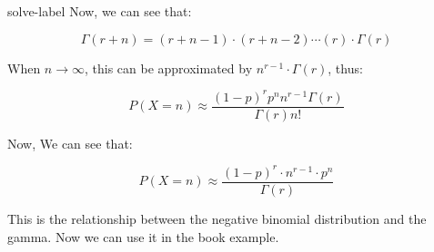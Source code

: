 \begin{solve}{}{solve-label}
Now, we can see that:

\[
\Gamma(r+n) = (r+n-1) \cdot (r+n-2) \cdots (r) \cdot \Gamma(r)
\]

When $n \rightarrow \infty$, this can be approximated by \(n^{r-1} \cdot \Gamma(r)\), thus:

\[
P(X = n) \approx \frac{(1-p)^r p^n n^{r-1} \Gamma(r)}{\Gamma(r) n!}
\]

Now, We can see that:

\[
P(X = n) \approx \frac{(1-p)^r \cdot n^{r-1} \cdot p^n}{\Gamma(r)}
\]

This is the relationship between the negative binomial distribution and the gamma. Now we can use it in the book example.
	\end{solve}
	
	
	
	
	
